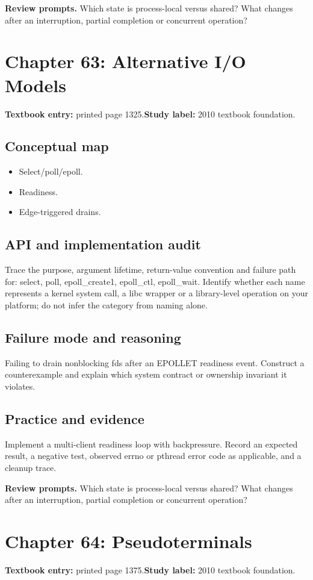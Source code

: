 \documentclass[11pt,letterpaper,oneside]{report}
\begin{document}
\textbf{Review prompts.} Which state is process-local versus shared? What changes after an interruption, partial completion or concurrent operation?

\section{Chapter 63: Alternative I/O Models}
\textbf{Textbook entry:} printed page 1325.\quad \textbf{Study label:} 2010 textbook foundation.

\subsection{Conceptual map}
\begin{itemize}
\item Select/poll/epoll.
\item Readiness.
\item Edge-triggered drains.
\end{itemize}
\subsection{API and implementation audit}
Trace the purpose, argument lifetime, return-value convention and failure path for: select, poll, epoll\_create1, epoll\_ctl, epoll\_wait. Identify whether each name represents a kernel system call, a libc wrapper or a library-level operation on your platform; do not infer the category from naming alone.

\subsection{Failure mode and reasoning}
Failing to drain nonblocking fds after an EPOLLET readiness event. Construct a counterexample and explain which system contract or ownership invariant it violates.

\subsection{Practice and evidence}
Implement a multi-client readiness loop with backpressure. Record an expected result, a negative test, observed errno or pthread error code as applicable, and a cleanup trace.

\textbf{Review prompts.} Which state is process-local versus shared? What changes after an interruption, partial completion or concurrent operation?

\section{Chapter 64: Pseudoterminals}
\textbf{Textbook entry:} printed page 1375.\quad \textbf{Study label:} 2010 textbook foundation.
\end{document}
